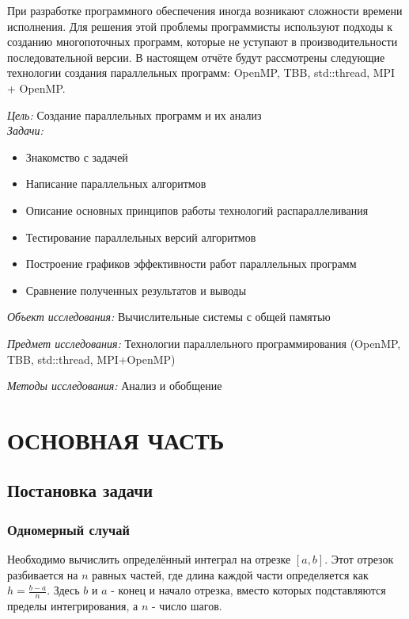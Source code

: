 \documentclass[14pt,a4paper]{article}
\begin{document}
При разработке программного обеспечения иногда возникают сложности времени исполнения. Для решения этой проблемы программисты используют подходы к созданию многопоточных программ, которые не уступают в производительности последовательной версии. В настоящем отчёте будут рассмотрены следующие технологии создания параллельных программ: OpenMP, TBB, std::thread, MPI + OpenMP.

\begin{flushleft}


\textit{Цель:} Создание параллельных программ и их анализ \\
\textit{Задачи:}
\begin{itemize}
\item Знакомство с задачей
\item Написание параллельных алгоритмов
\item Описание основных принципов работы технологий распараллеливания
\item Тестирование параллельных версий алгоритмов
\item Построение графиков эффективности работ параллельных программ
\item Сравнение полученных результатов и выводы
\end{itemize}

\textit{Объект исследования:} Вычислительные системы с общей памятью
\vspace{0.5cm}

\textit{Предмет исследования:} Технологии параллельного программирования
 (OpenMP, TBB, std::thread, MPI+OpenMP)
\vspace{0.5cm}

\textit{Методы исследования:} Анализ и обобщение
\end{flushleft}



\newpage

\section{ОСНОВНАЯ ЧАСТЬ}

\subsection{Постановка задачи}
\subsubsection{Одномерный случай}
Необходимо вычислить определённый интеграл на отрезке $[a, b]$. Этот отрезок разбивается на $n$ равных частей, где длина каждой части определяется как $h = \frac{b - a}{n}$. Здесь $b$ и $a$ - конец и начало отрезка, вместо которых подставляются пределы интегрирования, а $n$ - число шагов.
\end{document}
